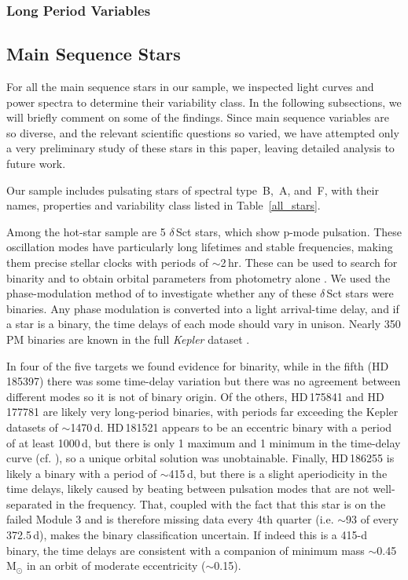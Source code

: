 \documentclass[a4paper,fleqn,usenatbib]{mnras}
\begin{document}
\subsubsection{Long Period Variables}
\label{lpvs}

\subsection{Main Sequence Stars}
\label{mainseq}

For all the main sequence stars in our sample, we inspected light curves and power spectra to determine their variability class. In the following subsections, we will briefly comment on some of the findings. Since main sequence variables are so diverse, and the relevant scientific questions so varied, we have attempted only a very preliminary study of these stars in this paper, leaving detailed analysis to future work.

Our sample includes pulsating stars of spectral type~B,~A, and~F, with their names, properties and variability class listed in Table~\ref{all_stars}. 

Among the hot-star sample are 5 $\delta$\,Sct stars, which show p-mode pulsation. These oscillation modes have particularly long lifetimes and stable frequencies, making them precise stellar clocks with periods of $\sim$2\,hr. These can be used to search for binarity and to obtain orbital parameters from photometry alone \citep{shibahashi&kurtz2012}. We used the phase-modulation method of \citet{murphyetal2014} to investigate whether any of these $\delta$\,Sct stars were binaries. Any phase modulation is converted into a light arrival-time delay, and if a star is a binary, the time delays of each mode should vary in unison. Nearly 350 PM binaries are known in the full \textit{Kepler} dataset \citep{murphyetal2018}.

In four of the five targets we found evidence for binarity, while in the fifth (HD\,185397) there was some time-delay variation but there was no agreement between different modes so it is not of binary origin. Of the others, HD\,175841 and HD\,177781 are likely very long-period binaries, with periods far exceeding the Kepler datasets of $\sim$1470\,d. HD\,181521 appears to be an eccentric binary with a period of at least 1000\,d, but there is only 1 maximum and 1 minimum in the time-delay curve (cf. \citep{murphy&shibahashi2015}), so a unique orbital solution was unobtainable. Finally, HD\,186255 is likely a binary with a period of $\sim$415\,d, but there is a slight aperiodicity in the time delays, likely caused by beating between pulsation modes that are not well-separated in the frequency. That, coupled with the fact that this star is on the failed Module 3 and is therefore missing data every 4th quarter (i.e. $\sim$93 of every 372.5\,d), makes the binary classification uncertain. If indeed this is a 415-d binary, the time delays are consistent with a companion of minimum mass $\sim$0.45\,M$_{\odot}$ in an orbit of moderate eccentricity ($\sim$0.15).
\end{document}
